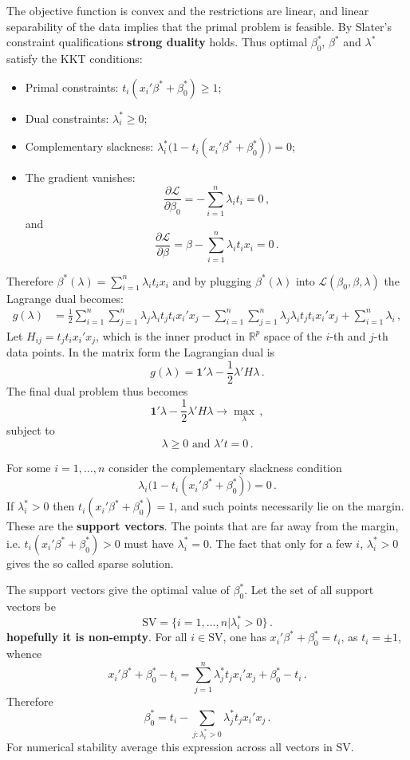 \documentclass[a4paper]{article}
\newcommand{\Real}{\mathbb{R}}
\newcommand{\one}{\mathbf{1}}
\newcommand{\Lcal}{\mathcal{L}}
\begin{document}
The objective function is convex and the restrictions are linear, and linear separability
of the data implies that the primal problem is feasible. By Slater's constraint
qualifications \textbf{strong duality} holds. Thus optimal $\beta_0^*$, $\beta^*$
and $\lambda^*$ satisfy the KKT conditions: \begin{itemize}
	\item Primal constraints: $t_i( x_i'\beta^* + \beta^*_0 )\geq1$;
	\item Dual constraints: $\lambda^*_i\geq 0$;
	\item Complementary slackness: $\lambda^*_i \bigl( 1 - t_i(x_i'\beta^*+\beta^*_0) \bigr) = 0$;
	\item The gradient vanishes:
	\[ \frac{\partial \Lcal}{\partial \beta_0} = - \sum_{i=1}^n \lambda_i t_i = 0\,, \]
	and
	\[ \frac{\partial \Lcal}{\partial \beta} = \beta - \sum_{i=1}^n \lambda_i t_i x_i = 0\,. \]
\end{itemize}
Therefore $\beta^*(\lambda) = \sum_{i=1}^n \lambda_i t_i x_i$ and by plugging
$\beta^*(\lambda)$ into $\Lcal(\beta_0, \beta, \lambda)$ the Lagrange dual becomes:
\begin{align*}
	g(\lambda)
	&= \frac{1}{2} \sum_{i=1}^n \sum_{j=1}^n \lambda_j \lambda_i t_j t_i x_i'x_j
		- \sum_{i=1}^n \sum_{j=1}^n \lambda_j \lambda_i t_j t_i x_i' x_j
		+ \sum_{i=1}^n \lambda_i\,,
\end{align*}
Let $H_{ij} = t_j t_i x_i' x_j$, which is the inner product in $\Real^p$ space of
the $i$-th and $j$-th data points. In the matrix form the Lagrangian dual is
\[ g(\lambda) = \one' \lambda - \frac{1}{2} \lambda'H\lambda \,. \]
The final dual problem thus becomes
\[ \one' \lambda - \frac{1}{2} \lambda' H \lambda \to \max_\lambda\,,\]
subject to
\[ \lambda \geq 0 \text{ and } \lambda' t = 0\,. \]

For some $i=1,\ldots, n$ consider the complementary slackness condition
\[ \lambda_i \bigl( 1 - t_i ( x_i'\beta^* + \beta^*_0 ) \bigr) = 0 \,. \]
If $\lambda^*_i > 0 $ then $t_i ( x_i'\beta^* + \beta^*_0) = 1$, and such points
necessarily lie on the margin. These are the \textbf{support vectors}. The points
that are far away from the margin, i.e. $t_i ( x_i'\beta^* + \beta^*_0) > 0$ must
have $\lambda^*_i = 0$. The fact that only for a few $i$, $\lambda^*_i>0$ gives
the so called sparse solution.

The support vectors give the optimal value of $\beta^*_0$. Let the set of all support
vectors be
\[ \text{SV} = \{i=1,\ldots,n| \lambda^*_i>0\} \,. \]
\textbf{hopefully it is non-empty}. For all $i\in \text{SV}$, one has
$x_i'\beta^* + \beta^*_0 = t_i $, as $t_i = \pm 1$, whence
\[ 
x_i'\beta^* + \beta^*_0 - t_i 
= \sum_{j=1}^n \lambda^*_j t_j x_i'x_j + \beta^*_0 - t_i \,.
\]
Therefore
\[ \beta^*_0 = t_i - \sum_{j:\lambda^*_i>0} \lambda^*_j t_j x_i'x_j \,. \]
For numerical stability average this expression across all vectors in $\text{SV}$.
\end{document}
